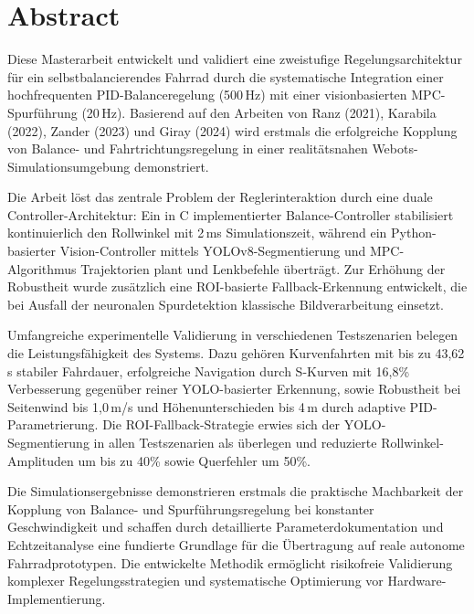 \section{Abstract}
  Diese Masterarbeit entwickelt und validiert eine zweistufige Regelungsarchitektur für ein
  selbstbalancierendes Fahrrad durch die systematische Integration einer hochfrequenten PID-Balanceregelung (500\,Hz) mit 
  einer visionbasierten MPC-Spurführung (20\,Hz). Basierend auf den Arbeiten von Ranz (2021), Karabila (2022), Zander (2023) 
  und Giray (2024) wird erstmals die erfolgreiche Kopplung von Balance- und Fahrtrichtungsregelung in einer realitätsnahen 
  Webots-Simulationsumgebung demonstriert.

  Die Arbeit löst das zentrale Problem der Reglerinteraktion durch eine duale Controller-Architektur: Ein in C implementierter 
  Balance-Controller stabilisiert kontinuierlich den Rollwinkel mit 2\,ms Simulationszeit, während ein Python-basierter Vision-Controller 
  mittels YOLOv8-Segmentierung und MPC-Algorithmus Trajektorien plant und Lenkbefehle überträgt. Zur Erhöhung der Robustheit wurde 
  zusätzlich eine ROI-basierte Fallback-Erkennung entwickelt, die bei Ausfall der neuronalen Spurdetektion klassische Bildverarbeitung einsetzt.

  Umfangreiche experimentelle Validierung in verschiedenen Testszenarien belegen die Leistungsfähigkeit des Systems. Dazu gehören
  Kurvenfahrten mit bis zu 43,62\,s stabiler Fahrdauer, erfolgreiche Navigation durch S-Kurven mit 16,8\% Verbesserung gegenüber 
  reiner YOLO-basierter Erkennung, sowie Robustheit bei Seitenwind bis 1,0\,m/s und Höhenunterschieden bis 4\,m durch adaptive 
  PID-Parametrierung. Die ROI-Fallback-Strategie erwies sich der YOLO-Segmentierung in allen Testszenarien als überlegen und 
  reduzierte Rollwinkel-Amplituden um bis zu 40\% sowie Querfehler um 50\%.

  Die Simulationsergebnisse demonstrieren erstmals die praktische Machbarkeit der Kopplung von Balance- und Spurführungsregelung 
  bei konstanter Geschwindigkeit und schaffen durch detaillierte Parameterdokumentation und Echtzeitanalyse eine fundierte Grundlage 
  für die Übertragung auf reale autonome Fahrradprototypen. Die entwickelte Methodik ermöglicht risikofreie Validierung komplexer 
  Regelungsstrategien und systematische Optimierung vor Hardware-Implementierung.
\newpage